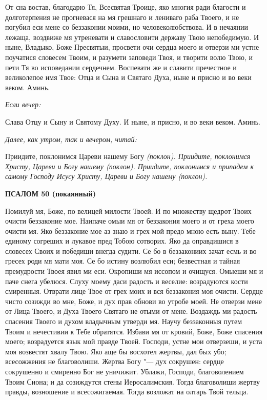    От сна востав, благодарю Тя, Всесвятая Троице, яко многия ради
благости и долготерпения не прогневася на мя грешнаго и лениваго раба
Твоего, и не погубил еси мене со беззаконии моими, но человеколюбствова. И
в нечаянии лежаща, воздвиже мя утреневати и славословити державу
Твою непобедимую. И ныне, Владыко, Боже Пресвятыи, просвети
очи сердца моего и отверзи ми устне поучатися словесем Твоим, и
разумети заповеди Твоя, и творити волю Твою, и пети Тя во исповедании
сердечнем. Воспевати же и славити пречестное и великолепое имя
Твое: Отца и Сына и Святаго Духа, ныне и присно и во веки веком.
Аминь.


 \itshape Если вечер:\normalfont{}


   Слава Отцу и Сыну и Святому Духу. И ныне, и присно, и во веки веком.
Аминь.


 \itshape Далее, как утром, так и вечером, читай:\normalfont{}


   Приидите, поклонимся Цареви нашему Богу \itshape (поклон)\normalfont{}. Приидите,
поклонимся Христу, Цареви и Богу нашему \itshape (поклон)\normalfont{}. Приидите, поклонимся
и припадем к самому Господу Исусу Христу, Цареви и Богу нашему
\itshape (поклон)\normalfont{}.



 

\bfseries ПСАЛОМ 50 (покаянный)\normalfont{}


   Помилуй мя, Боже, по велицей милости Твоей. И по множеству щедрот
Твоих очисти беззаконие мое. Наипаче омыи мя от беззакония моего и от
греха моего очисти мя. Яко беззаконие мое аз знаю и грех мой предо мною
есть выну. Тебе единому согреших и лукавое пред Тобою сотворих. Яко да
оправдишися в словесех Своих и победиши внегда судити. Се бо в
беззакониих зачат есмь и во гресех роди мя мати моя. Се бо истину возлюбил
еси; безвестная и тайная премудрости Твоея явил ми еси. Окропиши мя
иссопом и очищуся. Омыеши мя и паче снега убелюся. Слуху моему даси
радость и веселие: возрадуются кости смиренныя. Отврати лице Твое от
грех моих и вся беззакония моя очисти. Сердце чисто созижди во
мне, Боже, и дух прав обнови во утробе моей. Не отверзи мене от
Лица Твоего, и Духа Твоего Святаго не отыми от мене. Воздаждь ми
радость спасения Твоего и духом владычным утверди мя. Научу
беззаконныя путем Твоим и нечестивии к Тебе обратятся. Избави мя от
кровий, Боже, Боже спасения моего; возрадуется язык мой правде
Твоей. Господи, устне мои отверзеши, и уста моя возвестят хвалу
Твою. Яко аще бы восхотел жертвы, дал бых убо; всесожжения не
благоволиши. Жертва Богу "--- дух сокрушен: сердце сокрушенно и смиренно
Бог не уничижит. Ублажи, Господи, благоволением Твоим Сиона; и
да созиждутся стены Иеросалимския. Тогда благоволиши жертву
правды, возношение и всесожигаемая. Тогда возложат на олтарь Твой
тельца.


